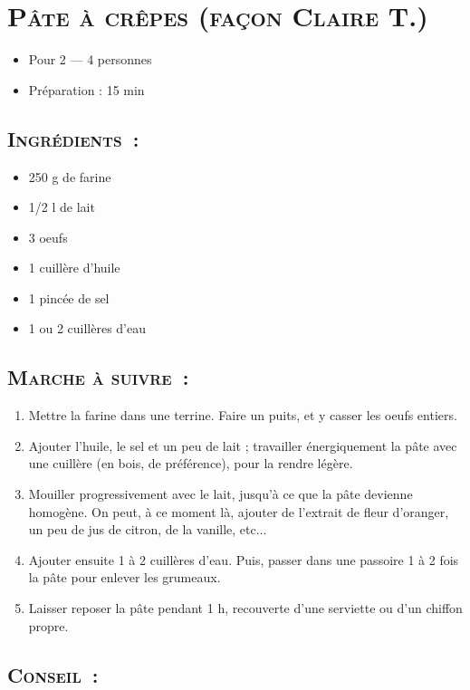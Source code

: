 \section[\normalsize{P\^ate \`a cr\^epes (fa\c con Claire T.)}]{\LARGE{\textsc{P\^ate \`a cr\^epes (fa\c con Claire T.)}}}		%


\begin{itemize}
\item Pour 2 --- 4 personnes
\item Préparation : 15 min
\end{itemize}

\subsection*{\textsc{Ingr\'edients~:}}

\begin{itemize}
\item 250 g de farine
\item 1/2 l de lait
\item 3 oeufs
\item 1 cuill\`ere d'huile
\item 1 pinc\'ee de sel
\item 1 ou 2 cuill\`eres d'eau
\end{itemize}


\subsection*{\textsc{Marche \`a suivre~:}}

\begin{enumerate}
\item Mettre la farine dans une terrine. Faire un puits, et y casser les oeufs entiers.
\item Ajouter l'huile, le sel et un peu de lait ; travailler \'energiquement la p\^ate avec une cuill\`ere (en bois, de pr\'ef\'erence), pour la rendre l\'eg\`ere.
\item Mouiller progressivement avec le lait, jusqu'\`a ce que la p\^ate devienne homog\`ene. On peut, \`a ce moment l\`a, ajouter de l'extrait de fleur d'oranger, un peu de jus de citron, de la vanille, etc...
\item Ajouter ensuite 1 \`a 2 cuill\`eres d'eau. Puis, passer dans une passoire 1 \`a 2 fois la p\^ate pour enlever les grumeaux.
\item Laisser reposer la p\^ate pendant 1 h, recouverte d'une serviette ou d'un chiffon propre.

\end{enumerate}
\subsection*{\textsc{Conseil~:}}

